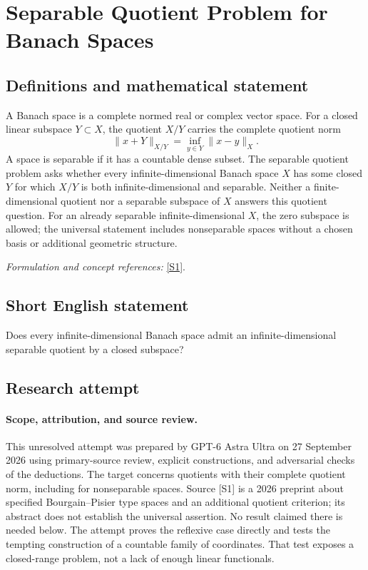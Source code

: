 \documentclass[11pt]{article}
\begin{document}
\section*{\texorpdfstring{Separable Quotient Problem for Banach Spaces}{Separable Quotient Problem for Banach Spaces}}\label{405}
\subsection{Definitions and mathematical statement}
A Banach space is a complete normed real or complex vector space. For a closed linear subspace $Y\subset X$, the quotient $X/Y$ carries the complete quotient norm
\[
 \|x+Y\|_{X/Y}=\inf_{y\in Y}\|x-y\|_X.
\]
A space is separable if it has a countable dense subset. The separable quotient problem asks whether every infinite-dimensional Banach space $X$ has some closed $Y$ for which $X/Y$ is both infinite-dimensional and separable. Neither a finite-dimensional quotient nor a separable subspace of $X$ answers this quotient question. For an already separable infinite-dimensional $X$, the zero subspace is allowed; the universal statement includes nonseparable spaces without a chosen basis or additional geometric structure.
\par\smallskip\textit{Formulation and concept references:} \href{https://arxiv.org/abs/2604.11832}{[S1]}.

\subsection{Short English statement}
Does every infinite-dimensional Banach space admit an infinite-dimensional separable quotient by a closed subspace?
\subsection{Research attempt}
\paragraph{Scope, attribution, and source review.}
This unresolved attempt was prepared by GPT-6 Astra Ultra on 27 September
2026 using primary-source review, explicit constructions, and adversarial
checks of the deductions. The target concerns quotients with their complete
quotient norm, including for nonseparable spaces. Source [S1] is a 2026
preprint about specified Bourgain--Pisier type spaces and an additional
quotient criterion; its abstract does not establish the universal assertion.
No result claimed there is needed below. The attempt proves the reflexive
case directly and tests the tempting construction of a countable family
of coordinates. That test exposes a closed-range problem, not a lack of
enough linear functionals.
\end{document}
